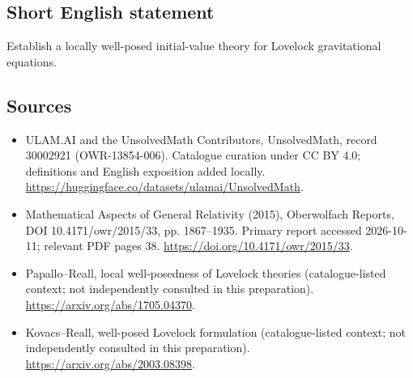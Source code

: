 \documentclass[11pt]{article}
\begin{document}
\subsection{Short English statement}
Establish a locally well-posed initial-value theory for Lovelock gravitational equations.
\subsection{Sources}
\begin{itemize}
\item[\hypertarget{source:30002921:1}{S1}] ULAM.AI and the UnsolvedMath Contributors, UnsolvedMath, record 30002921 (OWR-13854-006). Catalogue curation under CC BY 4.0; definitions and English exposition added locally.
\url{https://huggingface.co/datasets/ulamai/UnsolvedMath}.
\item[\hypertarget{source:30002921:2}{S2}] Mathematical Aspects of General Relativity (2015), Oberwolfach Reports, DOI 10.4171/owr/2015/33, pp. 1867--1935. Primary report accessed 2026-10-11; relevant PDF pages 38.
\url{https://doi.org/10.4171/owr/2015/33}.
\item[\hypertarget{source:30002921:3}{S3}] Papallo--Reall, local well-posedness of Lovelock theories (catalogue-listed context; not independently consulted in this preparation).
\url{https://arxiv.org/abs/1705.04370}.
\item[\hypertarget{source:30002921:4}{S4}] Kovacs--Reall, well-posed Lovelock formulation (catalogue-listed context; not independently consulted in this preparation).
\url{https://arxiv.org/abs/2003.08398}.
\end{itemize}
\label{end:30002921}
\end{document}

